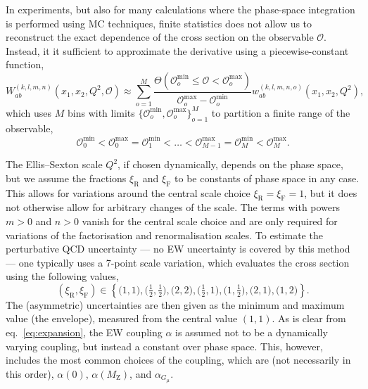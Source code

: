 In experiments, but also for many calculations where the phase-space integration is performed using MC techniques, finite statistics does not allow us to reconstruct the exact dependence of the cross section on the observable $\mathcal{O}$.
Instead, it it sufficient to approximate the derivative using a piecewise-constant function,
\begin{equation}
W_{ab}^{(k,l,m,n)} \left( x_1, x_2, Q^2, \mathcal{O} \right) \approx \sum_{o=1}^M \frac{\Theta (\mathcal{O}_o^\mathrm{min} \le \mathcal{O} < \mathcal{O}_o^\mathrm{max})}{\mathcal{O}_o^\mathrm{max} - \mathcal{O}_o^\mathrm{min}} w_{ab}^{(k,l,m,n,o)} \left( x_1, x_2, Q^2 \right) \text{,}
\end{equation}
which uses $M$ bins with limits $\{ \mathcal{O}_o^\mathrm{min}, \mathcal{O}_o^\mathrm{max} \}_{o=1}^M$ to partition a finite range of the observable,
\begin{equation}
\mathcal{O}_0^\mathrm{min} < \mathcal{O}_0^\mathrm{max} = \mathcal{O}_1^\mathrm{min} < \ldots < \mathcal{O}_{M-1}^\mathrm{max} = \mathcal{O}_M^\mathrm{min} < \mathcal{O}_M^\mathrm{max} \text{.}
\label{eq:bins-of-diff-xsection}
\end{equation}

The Ellis--Sexton scale $Q^2$, if chosen dynamically, depends on the phase space, but we assume the fractions $\xi_\mathrm{R}$ and $\xi_\mathrm{F}$ to be constants of phase space in any case.
This allows for variations around the central scale choice $\xi_\mathrm{R} = \xi_\mathrm{F} = 1$, but it does not otherwise allow for arbitrary changes of the scale.
The terms with powers $m > 0$ and $n > 0$ vanish for the central scale choice and are only required for variations of the factorisation and renormalisation scales.
To estimate the perturbative QCD uncertainty --- no EW uncertainty is covered by this method --- one typically uses a 7-point scale variation, which evaluates the cross section using the following values,
\begin{equation}
(\xi_\mathrm{R}, \xi_\mathrm{F}) \in \left\{ \bigl( 1, 1 \bigr), \bigl( \tfrac{1}{2}, \tfrac{1}{2} \bigr), \bigl( 2, 2 \bigr), \bigl( \tfrac{1}{2}, 1 \bigr), \bigl( 1, \tfrac{1}{2} \bigr), \bigl( 2, 1 \bigr), \bigl( 1, 2 \bigr) \right\} \text{.}
\end{equation}
The (asymmetric) uncertainties are then given as the minimum and maximum value (the envelope), measured from the central value $(1, 1)$.
As is clear from eq.~\eqref{eq:expansion}, the EW coupling $\alpha$ is assumed not to be a dynamically varying coupling, but instead a constant over phase space.
This, however, includes the most common choices of the coupling, which are (not necessarily in this order), $\alpha (0)$, $\alpha (M_\mathrm{Z})$, and $\alpha_{G_\mu}$.

